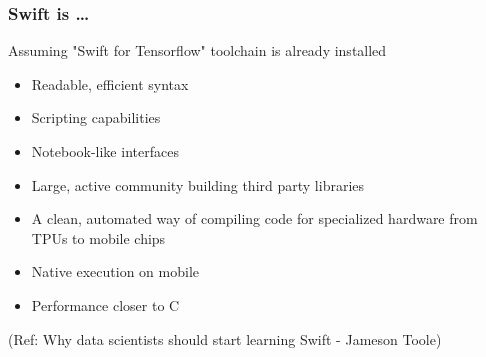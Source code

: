 \begin{frame} \frametitle{Swift is \ldots}

Assuming "Swift for Tensorflow" toolchain is already installed

\begin{itemize}
\item Readable, efficient syntax
\item Scripting capabilities
\item Notebook-like interfaces
\item Large, active community building third party libraries
\item A clean, automated way of compiling code for specialized hardware from TPUs to mobile chips
\item Native execution on mobile
\item Performance closer to C
\end{itemize}

{\tiny (Ref: Why data scientists should start learning Swift - Jameson Toole)}
 
\end{frame}

